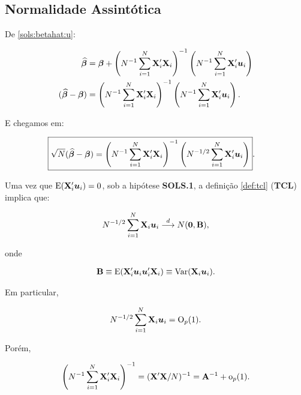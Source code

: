 \documentclass[11pt, oneside, a4paper, article]{article}
\numberwithin{equation}{section}
\begin{document}
\subsection{Normalidade Assintótica}

De \eqref{sols:betahat:u}:

\vspace{-2 em}
\begin{align*} 
	\widehat{\boldsymbol{\beta}}  &=
	\boldsymbol{\beta} +
	\left( N^{-1} \sum_{i=1}^{N} \mathbf{X}_{i}' \mathbf{X}_{i}   \right)^{-1}
	\left( N^{-1} \sum_{i=1}^{N} \mathbf{X}_{i}' \boldsymbol{u}_{i}   \right)
	\\ 
	(\widehat{\boldsymbol{\beta}} - \boldsymbol{\beta}) &= 
	\left( N^{-1} \sum_{i=1}^{N} \mathbf{X}_{i}' \mathbf{X}_{i}   \right)^{-1}
	\left( N^{-1} \sum_{i=1}^{N} \mathbf{X}_{i}' \boldsymbol{u}_{i}   \right).
\end{align*}

\noindent
E chegamos em:

\vspace{-1 em}
\begin{align} \label{sols:betahat:rootn}
	\Aboxed{
		\sqrt{N}(\betahatbold - \betavec) &= 
		\left( N^{-1} \sum_{i=1}^{N} \Xmat_{i}' \Xmat_{i}   \right)^{-1}
		\left( N^{-1/2} \sum_{i=1}^{N} \Xmat_{i}' \uvec_{i}   \right)
	}.
\end{align}

Uma vez que $\text{E}(\mathbf{X}_{i}' \boldsymbol{u}_{i})=0$, sob a hipótese \textbf{SOLS.1}, a definição \ref{def:tcl} (\textbf{TCL}) implica que:

\vspace{-1 em}
\begin{align*} 
	N^{-1/2} \sum_{i=1}^{N} \mathbf{X}_{i} \boldsymbol{u}_{i}  \overset{d}{\longrightarrow}  N(\boldsymbol{0}, \mathbf{B}),
\end{align*}

\noindent
onde

\vspace{-1 em}
\begin{align*} 
	\mathbf{B} \equiv \text{E}(\mathbf{X}_{i}' \boldsymbol{u}_{i} \boldsymbol{u}_{i}' \mathbf{X}_{i}) \equiv \text{Var}(\mathbf{X}_{i} \boldsymbol{u}_{i}).
\end{align*}

\noindent
Em particular,

\vspace{-1 em}
\begin{align*} 
	N^{-1/2} \sum_{i=1}^{N} \mathbf{X}_{i} \boldsymbol{u}_{i} = \text{O}_{p}(1).
\end{align*}

Porém,

\vspace{-1 em}
\begin{align*} 
	\left( N^{-1} \sum_{i=1}^{N} \mathbf{X}_{i}' \mathbf{X}_{i} \right)^{-1} = (\mathbf{X}'\mathbf{X}/N)^{-1} 
	=
	\mathbf{A}^{-1} + \text{o}_{p}(1).
\end{align*}
\end{document}
